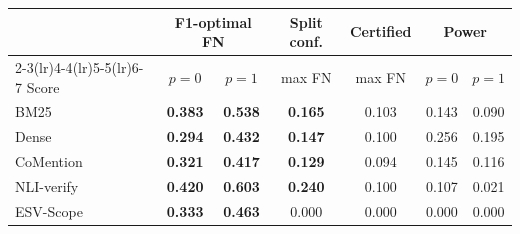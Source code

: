 \setlength{\tabcolsep}{2.5pt}
\begin{tabular}{lcccccc}
\toprule
 & \multicolumn{2}{c}{F1-optimal FN} & Split conf. & Certified & \multicolumn{2}{c}{Power} \\
\cmidrule(lr){2-3}\cmidrule(lr){4-4}\cmidrule(lr){5-5}\cmidrule(lr){6-7}
Score & $p=0$ & $p=1$ & max FN & max FN & $p=0$ & $p=1$ \\
\midrule
BM25 & \textbf{0.383} & \textbf{0.538} & \textbf{0.165} & 0.103 & 0.143 & 0.090 \\
Dense & \textbf{0.294} & \textbf{0.432} & \textbf{0.147} & 0.100 & 0.256 & 0.195 \\
CoMention & \textbf{0.321} & \textbf{0.417} & \textbf{0.129} & 0.094 & 0.145 & 0.116 \\
NLI-verify & \textbf{0.420} & \textbf{0.603} & \textbf{0.240} & 0.100 & 0.107 & 0.021 \\
ESV-Scope & \textbf{0.333} & \textbf{0.463} & 0.000 & 0.000 & 0.000 & 0.000 \\
\bottomrule
\end{tabular}
